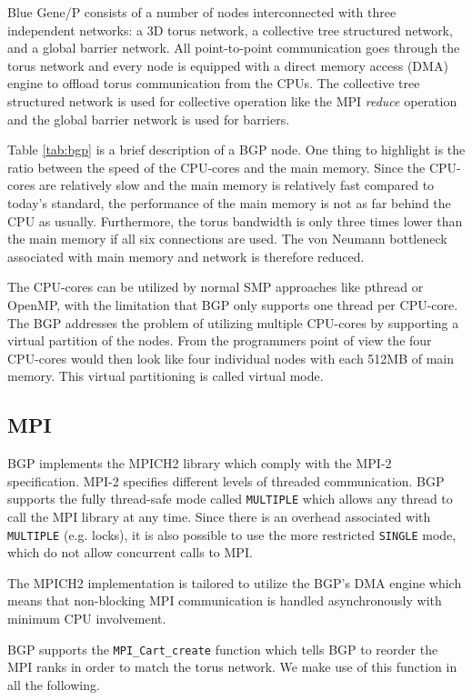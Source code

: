 \documentclass[preprint,3p,times,twocolumn]{elsarticle}
\begin{document}
Blue Gene/P consists of a number of nodes interconnected with three independent networks: a 3D torus network, a collective tree structured network, and a global barrier network. All point-to-point communication goes through the torus network and every node is equipped with a direct memory access (DMA) engine to offload torus communication from the CPUs. The collective tree structured network is used for collective operation like the MPI \emph{reduce} operation and the global barrier network is used for barriers.

Table \ref{tab:bgp} is a brief description of a BGP node. One thing to highlight is the ratio between the speed of the CPU-cores and the main memory. 
Since the CPU-cores are relatively slow and the main memory is relatively fast compared to today's standard, the performance of the main memory is not as far behind the CPU as usually. Furthermore, the torus bandwidth is only three times lower than the main memory if all six connections are used. The von Neumann bottleneck associated with main memory and network is therefore reduced.

The CPU-cores can be utilized by normal SMP approaches like pthread or OpenMP, with the limitation that BGP only supports one thread per CPU-core. The BGP addresses the problem of utilizing multiple CPU-cores by supporting a virtual partition of the nodes. From the programmers point of view the four CPU-cores would then look like four individual nodes with each 512MB of main memory. This virtual partitioning is called virtual mode.

\subsection{MPI}
BGP implements the MPICH2 library which comply with the MPI-2 specification\cite{mpi2}. MPI-2 specifies different levels of threaded communication. BGP supports the fully thread-safe mode called \texttt{MULTIPLE} which allows any thread to call the MPI library at any time. Since there is an overhead associated with \texttt{MULTIPLE} (e.g. locks), it is also possible to use the more restricted \texttt{SINGLE} mode, which do not allow concurrent calls to MPI.

The MPICH2 implementation is tailored to utilize the BGP's DMA engine which means that non-block\-ing MPI communication is handled asynchronously with minimum CPU involvement.

BGP supports the \texttt{MPI\_Cart\_create} function which tells BGP to reorder the MPI ranks in order to match the torus network. We make use of this function in all the following.
\end{document}
